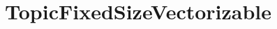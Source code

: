 \hypertarget{group___topic_fixed_size_vectorizable}{}\section{Topic\+Fixed\+Size\+Vectorizable}
\label{group___topic_fixed_size_vectorizable}
